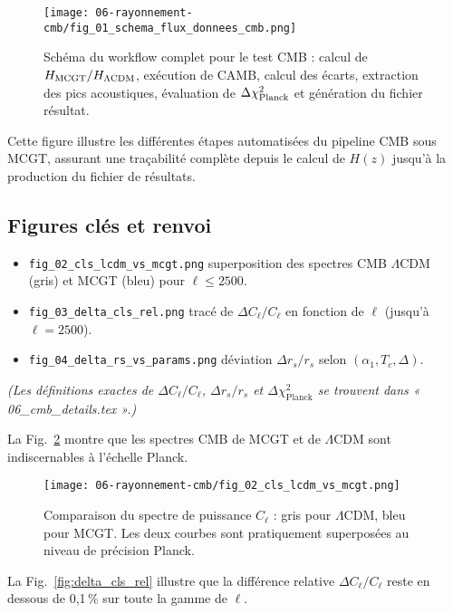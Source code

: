 \begin{figure}[htbp]
  \centering
  \texttt{[image: 06-rayonnement-cmb/fig\_01\_schema\_flux\_donnees\_cmb.png]}
  \caption{Schéma du workflow complet pour le test CMB : calcul de \(H_{\rm MCGT}/H_{\Lambda\rm CDM}\), exécution de CAMB, calcul des écarts, extraction des pics acoustiques, évaluation de \(\Delta\chi^2_{\rm Planck}\) et génération du fichier résultat.}
  \label{fig:flux_donnees_cmb}
\end{figure}

Cette figure illustre les différentes étapes automatisées du pipeline CMB sous MCGT, assurant une traçabilité complète depuis le calcul de \(H(z)\) jusqu’à la production du fichier de résultats.

\subsection{Figures clés et renvoi}

\begin{itemize}
  \item \texttt{fig\_02\_cls\_lcdm\_vs\_mcgt.png}  
        superposition des spectres CMB \(\Lambda\)CDM (gris) et MCGT (bleu) pour \(\ell \le 2500\).
  \item \texttt{fig\_03\_delta\_cls\_rel.png}  
        tracé de \(\Delta C_{\ell}/C_{\ell}\) en fonction de \(\ell\) (jusqu’à \(\ell=2500\)).
  \item \texttt{fig\_04\_delta\_rs\_vs\_params.png}  
        déviation \(\Delta r_{s}/r_{s}\) selon \((\alpha_{1},T_{c},\Delta)\).
\end{itemize}

\noindent\emph{(Les définitions exactes de \(\Delta C_{\ell}/C_{\ell}\), \(\Delta r_{s}/r_{s}\) et \(\Delta\chi^{2}_{\mathrm{Planck}}\) se trouvent dans « 06\_cmb\_details.tex ».)}

\noindent La Fig.~\ref{fig:cls_lcdm_vs_mcgt} montre que les spectres CMB de MCGT et de \(\Lambda\)CDM sont indiscernables à l’échelle Planck.

\begin{figure}[htbp]
  \centering
  \texttt{[image: 06-rayonnement-cmb/fig\_02\_cls\_lcdm\_vs\_mcgt.png]}
  \caption{Comparaison du spectre de puissance \(C_\ell\) : gris pour \(\Lambda\)CDM, bleu pour MCGT. Les deux courbes sont pratiquement superposées au niveau de précision Planck.}
  \label{fig:cls_lcdm_vs_mcgt}
\end{figure}

\noindent La Fig.~\ref{fig:delta_cls_rel} illustre que la différence relative \(\Delta C_{\ell}/C_{\ell}\) reste en dessous de 0,1\,\% sur toute la gamme de \(\ell\).


